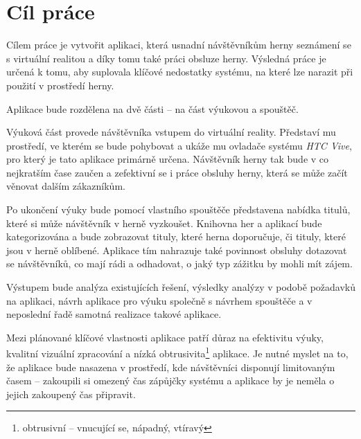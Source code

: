 \chapter{Cíl práce}\label{cuxedl-pruxe1ce}

Cílem práce je vytvořit aplikaci, která usnadní návštěvníkům
herny seznámení se s virtuální realitou a díky tomu také práci obsluze herny.
Výsledná práce je určená k tomu, aby suplovala klíčové nedostatky
systému, na které lze narazit při použití v prostředí herny.

Aplikace bude rozdělena na dvě části -- na část výukovou a spouštěč.

Výuková část provede návštěvníka vstupem do virtuální reality. Představí mu prostředí, ve kterém se bude pohybovat a ukáže mu ovladače systému \emph{HTC Vive}, pro který je tato aplikace
primárně určena. Návštěvník herny tak bude v co nejkratším čase zaučen a
zefektivní se i práce obsluhy herny, která se může začít věnovat dalším zákazníkům.

Po ukončení výuky bude pomocí vlastního spouštěče představena nabídka
titulů, které si může návštěvník v herně vyzkoušet. Knihovna her a
aplikací bude kategorizována a bude zobrazovat tituly, které
herna doporučuje, či tituly, které jsou v herně oblíbené. Aplikace tím nahrazuje také povinnost obsluhy dotazovat se návštěvníků, co mají rádi a
odhadovat, o jaký typ zážitku by mohli mít zájem.

\newpage

Výstupem bude analýza existujících řešení, výsledky analýzy v podobě
požadavků na aplikaci, návrh aplikace pro výuku společně s návrhem
spouštěče a v neposlední řadě samotná realizace takové aplikace.

Mezi plánované klíčové vlastnosti aplikace patří důraz na efektivitu výuky,
kvalitní vizuální zpracování a nízká obtrusivita\footnote{obtrusivní -- vnucující se, nápadný, vtíravý} aplikace. Je nutné
myslet na to, že aplikace bude nasazena v prostředí, kde návštěvníci
disponují limitovaným časem -- zakoupili si omezený čas zápůjčky systému
a aplikace by je neměla o jejich zakoupený čas připravit.
